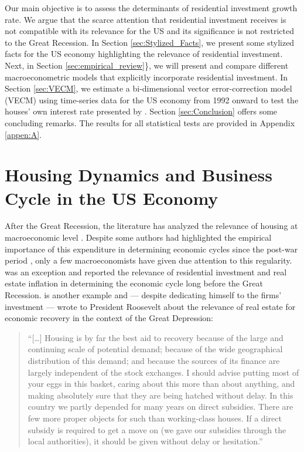 \documentclass[11pt]{article}
\begin{document}
Our main objective is to assess the determinants of residential investment growth rate.
We argue that the scarce attention that residential investment receives is not compatible with its relevance for the US and its significance is not restricted to the Great Recession.
In Section \ref{sec:Stylized_Facts}, we present some stylized facts for the US economy highlighting the relevance of residential investment.
Next, in Section \ref{sec:empirical_review}\}, we will present and compare different macroeconometric models that explicitly incorporate residential investment.
In Section \ref{sec:VECM}, we estimate a bi-dimensional vector error-correction model (VECM) using time-series data for the US economy from 1992 onward to test the houses' own interest rate presented by \textcite{teixeira_crescimento_2015}. 
Section \ref{sec:Conclusion} offers some concluding remarks.
The results for all statistical tests are provided in Appendix \ref{appen:A}.



\section{Housing Dynamics and Business Cycle in the US Economy}
\label{sec:org7524405}
\label{sec:Stylized_Facts}
After the Great Recession, the literature has analyzed the relevance of housing at macroeconomic level \cites{leamer_housing_2015}{teixeira_crescimento_2015}{fiebiger_semi-autonomous_2018}.
Despite some authors had highlighted the empirical importance of this expenditure in determining economic cycles since the post-war period \cites{grebler_capital_1956}{green_follow_1997}{leamer_housing_2007}, only a few macroeconomists have given due attention to this regularity.
\textcite{duesenberry_investment_1958} was an exception and reported the relevance of residential investment and real estate inflation in
determining the economic cycle long before the Great Recession.
\textcite{keynes_collected_1978} is another example and --- despite dedicating himself to the firms' investment --- wrote to President Roosevelt about the relevance of real estate for economic recovery in the context of the Great Depression:

\begin{quote}
    ``[\ldots{}] Housing is by far the best aid to recovery because of the large and continuing scale
of potential demand; because of the wide geographical distribution of this demand; and
because the sources of its finance are largely independent of the stock exchanges. I should
advise putting most of your eggs in this basket, caring about this more than about anything,
and making absolutely sure that they are being hatched without delay. In this country we
partly depended for many years on direct subsidies. There are few more proper objects for
such than working-class houses. If a direct subsidy is required to get a move on (we gave
our subsidies through the local authorities), it should be given without delay or hesitation.''
\cite[p.~436]{keynes_collected_1978}
\end{quote}
\end{document}
